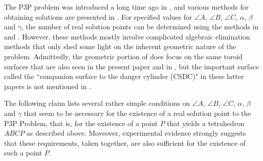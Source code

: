 \documentclass[a4paper, twoside]{article}
\begin{document}
The P3P problem was introduced a long time ago in \cite{G}, and various methods for obtaining solutions are presented in \cite{HLON}. For specified values for $\angle A$, $\angle B$, $\angle C$, $\alpha$, $\beta$ and $\gamma$, the number of real solution points can be determined using the methods in \cite{GHTC} and \cite{FMRE}. However, these methods mostly involve complicated algebraic elimination methods that only shed some light on the inherent geometric nature of the problem. Admittedly, the geometric portion of \cite{GHTC} does focus on the same toroid surfaces that are also seen in the present paper and in \cite{RW}, but the important surface called the ``companion surface to the danger cylinder (CSDC)" in these latter papers is not mentioned in \cite{GHTC}.

The following claim lists several rather simple conditions on $\angle A$, $\angle B$, $\angle C$, $\alpha$, $\beta$ and $\gamma$ that seem to be necessary for the existence of a real solution point to the P3P Problem, that is, for the existence of a point $P$ that yields a tetrahedron $ABCP$ as described above. Moveover, experimental evidence strongly suggests that these requirements, taken together, are also sufficient for the existence of such a point $P$.  \\
\end{document}
